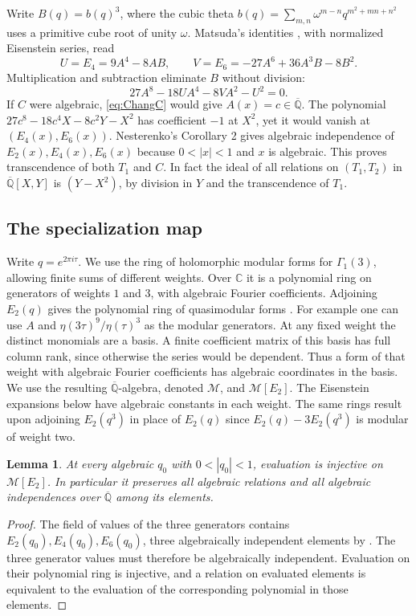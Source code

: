 \documentclass[11pt,a4paper]{article}
\newtheorem{lemma}[theorem]{Lemma}
\theoremstyle{definition}
\theoremstyle{remark}
\newcommand{\C}{\mathbb C}
\newcommand{\K}{\overline{\mathbb Q}}
\numberwithin{equation}{section}
\begin{document}
Write $B(q)=b(q)^3$, where the cubic theta $b(q)=\sum_{m,n}\omega^{m-n}q^{m^2+mn+n^2}$ uses a primitive cube root of unity $\omega$.
Matsuda's identities \cite[Thm.~5.1]{Matsuda}, with normalized Eisenstein series, read
\[
 U=E_4=9A^4-8AB,\qquad V=E_6=-27A^6+36A^3B-8B^2.
\]
Multiplication and subtraction eliminate $B$ without division:
\[
 27 A^8-18UA^4-8VA^2-U^2=0 .
\]
If $C$ were algebraic, \eqref{eq:ChangC} would give $A(x)=c\in\K$. The polynomial $27c^8-18c^4X-8c^2Y-X^2$ has coefficient $-1$ at $X^2$, yet it would vanish at $(E_4(x),E_6(x))$. Nesterenko's Corollary 2 \cite{Nest} gives algebraic independence of $E_2(x),E_4(x),E_6(x)$ because $0<|x|<1$ and $x$ is algebraic. This proves transcendence of both $T_1$ and $C$. In fact the ideal of all relations on $(T_1,T_2)$ in $\K[X,Y]$ is $(Y-X^2)$, by division in $Y$ and the transcendence of $T_1$.

\subsection{The specialization map}
Write $q=e^{2\pi i\tau}$. We use the ring of holomorphic modular forms for $\Gamma_1(3)$, allowing finite sums of different weights. Over $\C$ it is a polynomial ring on generators of weights $1$ and $3$, with algebraic Fourier coefficients. Adjoining $E_2(q)$ gives the polynomial ring of quasimodular forms \cite[\S4]{Clery}. For example one can use $A$ and $\eta(3\tau)^9/\eta(\tau)^3$ as the modular generators. At any fixed weight the distinct monomials are a basis. A finite coefficient matrix of this basis has full column rank, since otherwise the series would be dependent. Thus a form of that weight with algebraic Fourier coefficients has algebraic coordinates in the basis. We use the resulting $\K$-algebra, denoted $\mathcal M$, and $\mathcal M[E_2]$. The Eisenstein expansions below have algebraic constants in each weight. The same rings result upon adjoining $E_2(q^3)$ in place of $E_2(q)$ since $E_2(q)-3E_2(q^3)$ is modular of weight two.
\begin{lemma}\label{lem:evaluation}
At every algebraic $q_0$ with $0<|q_0|<1$, evaluation is injective on $\mathcal M[E_2]$. In particular it preserves all algebraic relations and all algebraic independences over $\K$ among its elements.
\end{lemma}
\begin{proof}
The field of values of the three generators contains $E_2(q_0), E_4(q_0), E_6(q_0)$, three algebraically independent elements by \cite{Nest}. The three generator values must therefore be algebraically independent. Evaluation on their polynomial ring is injective, and a relation on evaluated elements is equivalent to the evaluation of the corresponding polynomial in those elements.
\end{proof}
\end{document}
